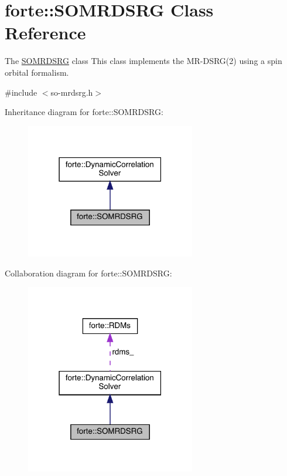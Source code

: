 \hypertarget{classforte_1_1_s_o_m_r_d_s_r_g}{}\section{forte\+:\+:S\+O\+M\+R\+D\+S\+RG Class Reference}
\label{classforte_1_1_s_o_m_r_d_s_r_g}


The \mbox{\hyperlink{classforte_1_1_s_o_m_r_d_s_r_g}{S\+O\+M\+R\+D\+S\+RG}} class This class implements the M\+R-\/\+D\+S\+RG(2) using a spin orbital formalism.  




{\ttfamily \#include $<$so-\/mrdsrg.\+h$>$}



Inheritance diagram for forte\+:\+:S\+O\+M\+R\+D\+S\+RG\+:
\nopagebreak
\begin{figure}[H]
\begin{center}
\leavevmode
\includegraphics[width=210pt]{classforte_1_1_s_o_m_r_d_s_r_g__inherit__graph}
\end{center}
\end{figure}


Collaboration diagram for forte\+:\+:S\+O\+M\+R\+D\+S\+RG\+:
\nopagebreak
\begin{figure}[H]
\begin{center}
\leavevmode
\includegraphics[width=210pt]{classforte_1_1_s_o_m_r_d_s_r_g__coll__graph}
\end{center}
\end{figure}
